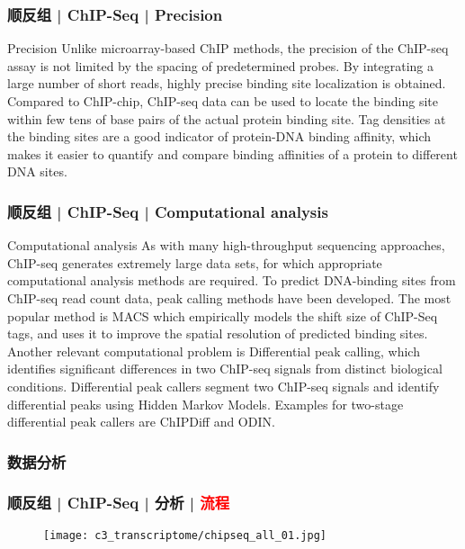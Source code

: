 \begin{frame}
  \frametitle{顺反组 | ChIP-Seq | Precision}
  \begin{block}{Precision}
    Unlike microarray-based ChIP methods, the precision of the ChIP-seq assay is not limited by the spacing of predetermined probes. By integrating a large number of short reads, highly precise binding site localization is obtained. Compared to ChIP-chip, ChIP-seq data can be used to locate the binding site within few tens of base pairs of the actual protein binding site. Tag densities at the binding sites are a good indicator of protein-DNA binding affinity, which makes it easier to quantify and compare binding affinities of a protein to different DNA sites.
  \end{block}
\end{frame}

\begin{frame}
  \frametitle{顺反组 | ChIP-Seq | Computational analysis}
  \begin{block}{Computational analysis}
    As with many high-throughput sequencing approaches, ChIP-seq generates extremely large data sets, for which appropriate computational analysis methods are required. To predict DNA-binding sites from ChIP-seq read count data, peak calling methods have been developed. The most popular method is MACS which empirically models the shift size of ChIP-Seq tags, and uses it to improve the spatial resolution of predicted binding sites.\\
    \vspace{1em}
    Another relevant computational problem is Differential peak calling, which identifies significant differences in two ChIP-seq signals from distinct biological conditions. Differential peak callers segment two ChIP-seq signals and identify differential peaks using Hidden Markov Models. Examples for two-stage differential peak callers are ChIPDiff and ODIN.
  \end{block}
\end{frame}

\subsubsection{数据分析}
\begin{frame}
  \frametitle{顺反组 | ChIP-Seq | 分析 | \textcolor{red}{流程}}
  \begin{figure}
    \centering
    \texttt{[image: c3\_transcriptome/chipseq\_all\_01.jpg]}
  \end{figure}
\end{frame}

